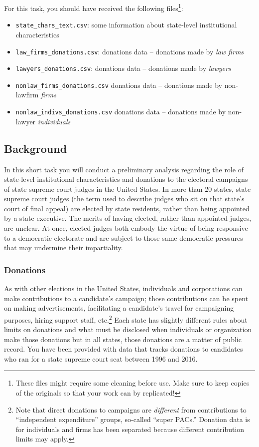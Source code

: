 \documentclass[11pt, letterpaper, twoside]{article}
\begin{document}
For this task, you should have received the following files\footnote{These files might require some cleaning before use. Make sure to keep copies of the originals so that your work can by replicated!}:
\begin{itemize}
    \item \verb|state_chars_text.csv|: some information about state-level institutional characteristics
    \item \verb|law_firms_donations.csv|: donations data -- donations made by \textit{law firms}
    \item \verb|lawyers_donations.csv|: donations data -- donations made by \textit{lawyers}
    \item \verb|nonlaw_firms_donations.csv| donations data -- donations made by non-lawfirm \textit{firms}
    \item \verb|nonlaw_indivs_donations.csv| donations data -- donations made by non-lawyer \textit{individuals} 
\end{itemize}

\subsection*{Background}
In this short task you will conduct a preliminary analysis regarding the role of state-level institutional characteristics and donations to the electoral campaigns of state supreme court judges in the United States. In more than 20 states, state supreme court judges (the term used to describe judges who sit on that state's court of final appeal) are elected by state residents, rather than being appointed by a state executive. The merits of having elected, rather than appointed judges, are unclear. At once, elected judges both embody the virtue of being responsive to a democratic electorate and are subject to those same democratic pressures that may undermine their impartiality. 

\subsubsection*{Donations}
As with other elections in the United States, individuals and corporations can make contributions to a candidate's campaign; those contributions can be spent on making advertisements, facilitating a candidate's travel for campaigning purposes, hiring support staff, etc.\footnote{Note that direct donations to campaigns are \textit{different} from contributions to ``independent expenditure'' groups, so-called ``super PACs.'' Donation data is for individuals and firms has been separated because different contribution limits may apply.} Each state has slightly different rules about limits on donations and what must be disclosed when individuals or organization make those donations but in all states, those donations are a matter of public record. You have been provided with data that tracks donations to candidates who ran for a state supreme court seat between 1996 and 2016.
\end{document}
